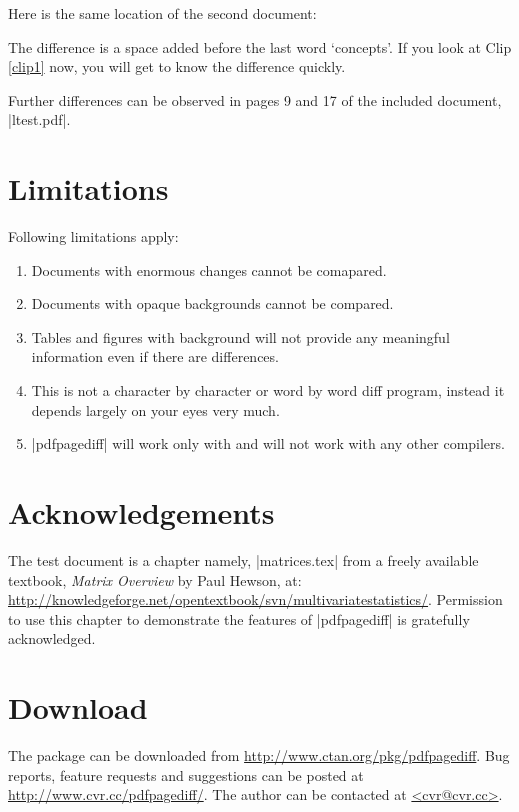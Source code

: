 \documentclass[a4paper]{article}
\begin{document}

Here is the same location of the second document:


\noindent The difference is a space added before the last word
`concepts'. If you look at Clip \ref{clip1} now, you will get to know
the difference quickly.

Further differences can be observed in pages 9 and 17 of the included
document, |ltest.pdf|.

\section{Limitations}
Following limitations apply:
\begin{enumerate}
\item Documents with enormous changes cannot be comapared.
\item Documents with opaque backgrounds cannot be compared.
\item Tables and figures with background will not provide any
  meaningful information even if there are differences.
\item This is not a character by character or word by word diff
  program, instead it depends largely on your eyes very much.
\item |pdfpagediff| will work only with \pdftex and will not work with
  any other \tex compilers.

\end{enumerate}

\section{Acknowledgements}

The test document is a chapter namely, |matrices.tex| from a freely
available textbook, \emph{Matrix Overview} by Paul Hewson, at:
\url{http://knowledgeforge.net/opentextbook/svn/multivariatestatistics/}.
Permission to use this chapter to demonstrate the features of
|pdfpagediff| is gratefully acknowledged.

\section{Download}

The package can be downloaded from
\url{http://www.ctan.org/pkg/pdfpagediff}.  Bug
reports, feature requests and suggestions can be posted at
\url{http://www.cvr.cc/pdfpagediff/}.  The author can be contacted at 
\url{<cvr@cvr.cc>}.
\end{document}
